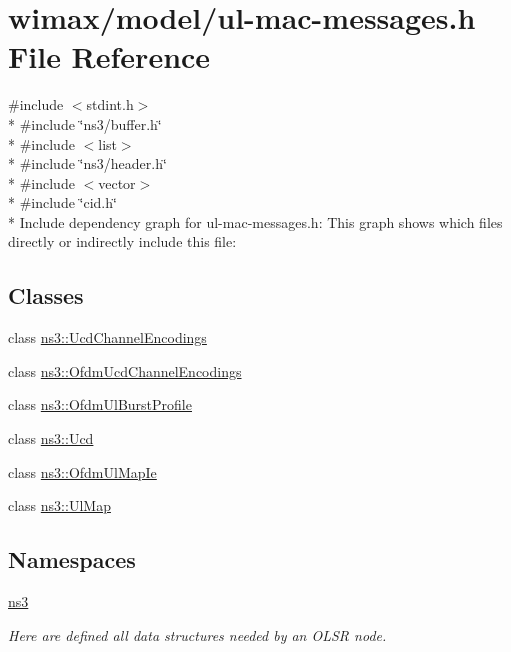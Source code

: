 \hypertarget{ul-mac-messages_8h}{}\section{wimax/model/ul-\/mac-\/messages.h File Reference}
\label{ul-mac-messages_8h}
{\ttfamily \#include $<$stdint.\+h$>$}\\*
{\ttfamily \#include \char`\"{}ns3/buffer.\+h\char`\"{}}\\*
{\ttfamily \#include $<$list$>$}\\*
{\ttfamily \#include \char`\"{}ns3/header.\+h\char`\"{}}\\*
{\ttfamily \#include $<$vector$>$}\\*
{\ttfamily \#include \char`\"{}cid.\+h\char`\"{}}\\*
Include dependency graph for ul-\/mac-\/messages.h\+:
This graph shows which files directly or indirectly include this file\+:
\subsection*{Classes}
\begin{DoxyCompactItemize}
\item 
class \hyperlink{classns3_1_1UcdChannelEncodings}{ns3\+::\+Ucd\+Channel\+Encodings}
\item 
class \hyperlink{classns3_1_1OfdmUcdChannelEncodings}{ns3\+::\+Ofdm\+Ucd\+Channel\+Encodings}
\item 
class \hyperlink{classns3_1_1OfdmUlBurstProfile}{ns3\+::\+Ofdm\+Ul\+Burst\+Profile}
\item 
class \hyperlink{classns3_1_1Ucd}{ns3\+::\+Ucd}
\item 
class \hyperlink{classns3_1_1OfdmUlMapIe}{ns3\+::\+Ofdm\+Ul\+Map\+Ie}
\item 
class \hyperlink{classns3_1_1UlMap}{ns3\+::\+Ul\+Map}
\end{DoxyCompactItemize}
\subsection*{Namespaces}
\begin{DoxyCompactItemize}
\item 
 \hyperlink{namespacens3}{ns3}
\begin{DoxyCompactList}\small\item\em Here are defined all data structures needed by an O\+L\+SR node. \end{DoxyCompactList}\end{DoxyCompactItemize}
